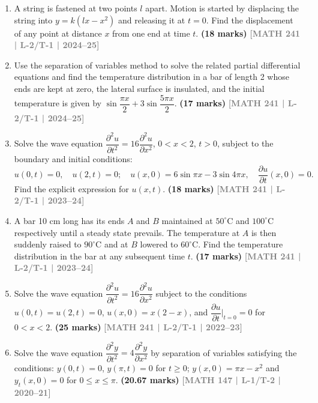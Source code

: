 \documentclass[12pt]{article}
\newcommand{\yr}[1]{\hfill\textcolor{gray}{\small\textbf{[#1]}}}
\newcommand{\mk}[1]{\textcolor{orange!70!black}{\small\textbf{(#1 marks)}}}
\begin{document}
\begin{enumerate}

\item A string is fastened at two points $l$ apart. Motion is started by displacing the string into $y=k(lx-x^{2})$ and releasing it at $t=0$. Find the displacement of any point at distance $x$ from one end at time $t$.
\mk{18} \yr{MATH 241 | L-2/T-1 | 2024--25}



\item Use the separation of variables method to solve the related partial differential equations and find the temperature distribution in a bar of length 2 whose ends are kept at zero, the lateral surface is insulated, and the initial temperature is given by $\sin\dfrac{\pi x}{2}+3\sin\dfrac{5\pi x}{2}$.
\mk{17} \yr{MATH 241 | L-2/T-1 | 2024--25}



\item Solve the wave equation $\dfrac{\partial^{2}u}{\partial t^{2}}=16\dfrac{\partial^{2}u}{\partial x^{2}}$, $0<x<2$, $t>0$, subject to the boundary and initial conditions: 
\[
u(0,t)=0, \quad u(2,t)=0; \quad u(x,0)=6\sin\pi x-3\sin 4\pi x, \quad \dfrac{\partial u}{\partial t}(x,0)=0.
\]
Find the explicit expression for $u(x,t)$.
\mk{18} \yr{MATH 241 | L-2/T-1 | 2023--24}



\item A bar 10 cm long has its ends $A$ and $B$ maintained at $50^{\circ}$C and $100^{\circ}$C respectively until a steady state prevails. The temperature at $A$ is then suddenly raised to $90^{\circ}$C and at $B$ lowered to $60^{\circ}$C. Find the temperature distribution in the bar at any subsequent time $t$.
\mk{17} \yr{MATH 241 | L-2/T-1 | 2023--24}



\item Solve the wave equation $\dfrac{\partial^{2}u}{\partial t^{2}}=16\dfrac{\partial^{2}u}{\partial x^{2}}$ subject to the conditions $u(0,t)=u(2,t)=0$, $u(x,0)=x(2-x)$, and $\dfrac{\partial u}{\partial t}\Big|_{t=0}=0$ for $0<x<2$.
\mk{25} \yr{MATH 241 | L-2/T-1 | 2022--23}



\item Solve the wave equation $\dfrac{\partial^{2}y}{\partial t^{2}}=4\dfrac{\partial^{2}y}{\partial x^{2}}$ by separation of variables satisfying the conditions: $y(0,t)=0$, $y(\pi,t)=0$ for $t\ge 0$; $y(x,0)=\pi x-x^{2}$ and $y_{t}(x,0)=0$ for $0\le x\le\pi$.
\mk{20.67} \yr{MATH 147 | L-1/T-2 | 2020--21}




\end{enumerate}
\end{document}
